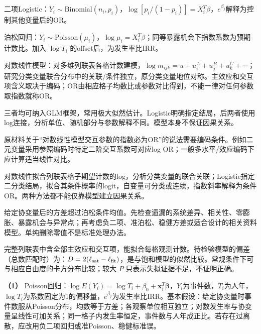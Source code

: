 
二项Logistic：\(Y_i\sim\mathrm{Binomial}(n_i,p_i)\)，\(\log[p_i/(1-p_i)]=X_i^T\beta\)，\(e^{\beta_j}\)解释为控制其他变量后的OR。

泊松回归：\(Y_i\sim\mathrm{Poisson}(\mu_i)\)，\(\log\mu_i=X_i^T\beta\)；同等暴露机会下指数系数为预期计数比。加入 \(\log T_i\) 的offset后，为发生率比IRR。

对数线性模型：对多维列联表各格计数建模，\(\log m_{ijk}=u+u_i^A+u_j^B+u_k^C+\cdots\)；研究分类变量联合分布中的关联/条件独立，原分类变量地位对称。主效应和交互项含义取决于编码；OR由相应格子均数比或参数对比得到，不能一律对任何参数取指数就称OR。

三者均可纳入GLM框架，常用极大似然估计。Logistic明确指定结局，后两者使用log连接，分析单位、随机部分与参数解释不同。模型本身不保证因果关系。

原材料关于``对数线性模型交互参数的指数必为OR''的说法需要编码条件。例如二元变量采用参照编码时特定二阶交互系数可对应log OR；一般多水平/效应编码下应计算适当线性对比。



对数线性拟合列联表格子期望计数的log，分析分类变量的联合关联；Logistic指定二分类结局，拟合其条件概率的logit，自变量可分类或连续，指数斜率解释为条件OR。两种方法都不能仅靠模型建立因果关系。



给定协变量后的方差超过泊松条件均值。先检查遗漏的系统差异、相关性、零膨胀、暴露机会与异常点；再考虑负二项、准泊松、稳健方差或适合设计的相关资料模型。单纯删除零值不是标准处理办法。



完整列联表中含全部主效应和交互项，能拟合每格观测计数。待检验模型的偏差（总数匹配时）为：\(D=2(\ell_{\rm sat}-\ell_{\rm fit})\)，是与饱和模型的似然比较。常规条件下可与相应自由度的卡方分布比较；较大 \(P\) 只表示失拟证据不足，不证明正确。



\textbf{（1）} Poisson回归：\(\log E(Y_i)=\log T_i+\beta_0+\boldsymbol x_i^T\boldsymbol\beta\)，\(Y_i\)为事件数，\(T_i\)为人年，\(\log T_i\)为系数固定为1的偏移量，\(e^{\beta_j}\)为发生率比IRR。基本假设：给定协变量时事件数服从Poisson分布，均数等于方差；各观察单位相互独立；对数发生率与协变量呈线性可加关系；同一格子内发生率恒定，事件数与人年成正比。若存在过离散，应改用负二项回归或准Poisson、稳健标准误。

